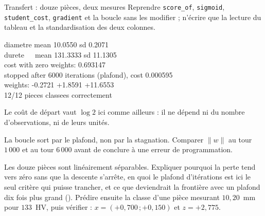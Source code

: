 \begin{tache}{Transfert : douze pièces, deux mesures}
 Reprendre \texttt{score\_of}, \texttt{sigmoid},
\texttt{student\_cost}, \texttt{gradient} et la boucle sans les modifier ;
n'écrire que la lecture du tableau et la standardisation des deux colonnes.

\begin{center}\ttfamily\footnotesize
diametre mean 10.0550 sd 0.2071\\
durete\ \ \ mean 131.3333 sd 11.1305\\
cost with zero weights: 0.693147\\[3pt]
stopped after 6000 iterations (plafond), cost 0.000595\\
weights: -0.2721 +1.8591 +11.6553\\
12/12 pieces classees correctement
\end{center}

 Le coût de départ vaut $\log 2$ ici comme ailleurs : il ne
dépend ni du nombre d'observations, ni de leurs unités.

 La boucle sort par le plafond, non par la stagnation. Comparer
$\|w\|$ au tour $1\,000$ et au tour $6\,000$ avant de conclure à une erreur de
programmation.

 Les douze pièces sont linéairement séparables. Expliquer
pourquoi la perte tend vers zéro sans que la descente s'arrête, en quoi le
plafond d'itérations est ici le seul critère qui puisse trancher, et ce que
deviendrait la frontière avec un plafond dix fois plus grand
(). Prédire ensuite la classe d'une pièce mesurant
$10{,}20$~mm pour $133$~HV, puis vérifier : $x=(+0{,}700\,;+0{,}150)$ et
$z=+2{,}775$.
\end{tache}
